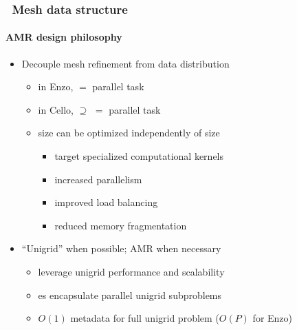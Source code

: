 \begin{frame}[fragile] 
\frametitle{\cello\ Mesh data structure}
\framesubtitle{AMR design philosophy}
\begin{itemize}
\small
\item Decouple mesh refinement from data distribution
  \begin{itemize}
  \item in Enzo,    $=$ parallel task 
  \item in Cello,   $\supseteq$  $=$ parallel task
  \item {} size can be optimized independently of  size
       \begin{itemize}
       \item target specialized computational kernels
       \item increased parallelism
       \item improved load balancing
       \item reduced memory fragmentation
       \end{itemize}
  \end{itemize}
\item ``Unigrid'' when possible; AMR when necessary
  \begin{itemize}
  \item leverage unigrid performance and scalability
  \item {}es encapsulate parallel unigrid subproblems
  \item $O(1)$ metadata for full unigrid problem ($O(P)$ for Enzo)
  \end{itemize}
\end{itemize}

\end{frame}

